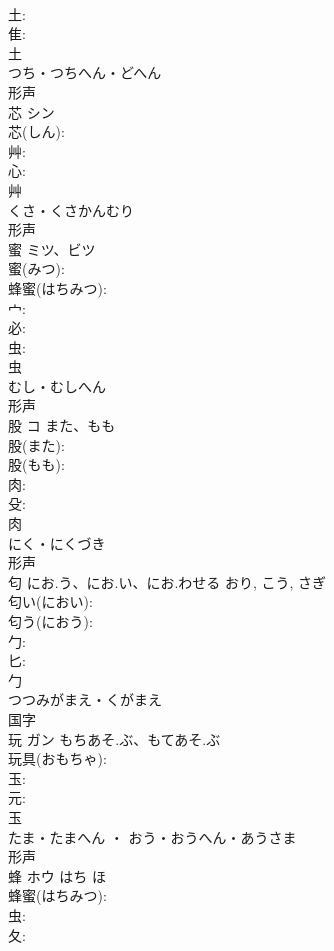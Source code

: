 \documentclass[8pt]{extreport}
\begin{document}
\begin{CJK}{UTF8}{min}
\\	土: 
\\	隹: 
\\	土	
\\	つち・つちへん・どへん	
\\	形声 
\\	芯	シン			
\\	芯(しん): 
\\	艸: 
\\	心: 
\\	艸	
\\	くさ・くさかんむり	
\\	形声 
\\	蜜	ミツ、ビツ			
\\	蜜(みつ): 
\\	蜂蜜(はちみつ): 
\\	宀: 
\\	必: 
\\	虫: 
\\	虫	
\\	むし・むしへん	
\\	形声 
\\	股	コ	また、もも		
\\	股(また): 
\\	股(もも): 
\\	肉: 
\\	殳: 
\\	肉	
\\	にく・にくづき	
\\	形声 
\\	匂		にお.う、にお.い、にお.わせる	おり, こう, さぎ	
\\	匂い(におい): 
\\	匂う(におう): 
\\	勹: 
\\	匕: 
\\	勹	
\\	つつみがまえ・くがまえ	
\\	国字 
\\	玩	ガン	もちあそ.ぶ、もてあそ.ぶ		
\\	玩具(おもちゃ): 
\\	玉: 
\\	元: 
\\	玉	
\\	たま・たまへん ・ おう・おうへん・あうさま	
\\	形声 
\\	蜂	ホウ	はち	ほ	
\\	蜂蜜(はちみつ): 
\\	虫: 
\\	夂: 

\end{CJK}
\end{document}
